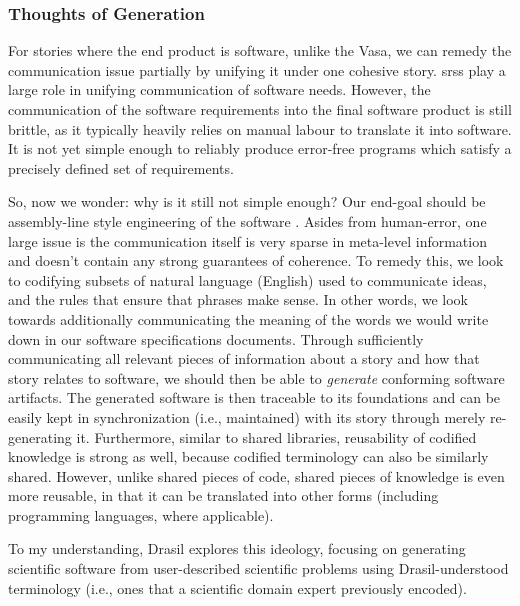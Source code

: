 \subsubsection{Thoughts of Generation}

For stories where the end product is software, unlike the Vasa, we can remedy
the communication issue partially by unifying it under one cohesive story.
\Aclp{srs} play a large role in unifying communication of software needs.
However, the communication of the software requirements into the final software
product is still brittle, as it typically heavily relies on manual labour to
translate it into software. It is not yet simple enough to reliably produce
error-free programs which satisfy a precisely defined set of requirements.

So, now we wonder: why is it still not simple enough? Our end-goal should be
assembly-line style engineering of the software \cite{well-understood}. Asides
from human-error, one large issue is the communication itself is very sparse in
meta-level information and doesn't contain any strong guarantees of coherence.
To remedy this, we look to codifying subsets of natural language (English) used
to communicate ideas, and the rules that ensure that phrases make sense. In
other words, we look towards additionally communicating the meaning of the words
we would write down in our software specifications documents. Through
sufficiently communicating all relevant pieces of information about a story and
how that story relates to software, we should then be able to \textit{generate}
conforming software artifacts. The generated software is then traceable to its
foundations and can be easily kept in synchronization (i.e., maintained) with
its story through merely re-generating it. Furthermore, similar to shared
libraries, reusability of codified knowledge is strong as well, because codified
terminology can also be similarly shared. However, unlike shared pieces of code,
shared pieces of knowledge is even more reusable, in that it can be translated
into other forms (including programming languages, where applicable).

To my understanding, Drasil \cite{Drasil2021} explores this ideology, focusing
on generating scientific software from user-described scientific problems using
Drasil-understood terminology (i.e., ones that a scientific domain expert
previously encoded).
